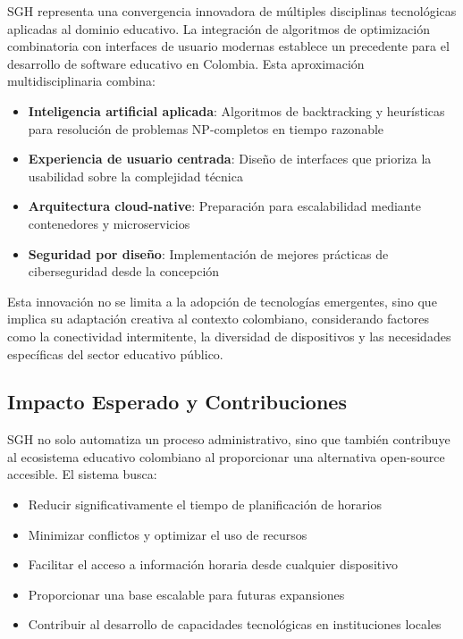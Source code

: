 SGH representa una convergencia innovadora de múltiples disciplinas tecnológicas aplicadas al dominio educativo. La integración de algoritmos de optimización combinatoria con interfaces de usuario modernas establece un precedente para el desarrollo de software educativo en Colombia. Esta aproximación multidisciplinaria combina:

\begin{itemize}
\item \textbf{Inteligencia artificial aplicada}: Algoritmos de backtracking y heurísticas para resolución de problemas NP-completos en tiempo razonable
\item \textbf{Experiencia de usuario centrada}: Diseño de interfaces que prioriza la usabilidad sobre la complejidad técnica
\item \textbf{Arquitectura cloud-native}: Preparación para escalabilidad mediante contenedores y microservicios
\item \textbf{Seguridad por diseño}: Implementación de mejores prácticas de ciberseguridad desde la concepción
\end{itemize}

Esta innovación no se limita a la adopción de tecnologías emergentes, sino que implica su adaptación creativa al contexto colombiano, considerando factores como la conectividad intermitente, la diversidad de dispositivos y las necesidades específicas del sector educativo público.

\subsection{Impacto Esperado y Contribuciones}

SGH no solo automatiza un proceso administrativo, sino que también contribuye al ecosistema educativo colombiano al proporcionar una alternativa open-source accesible. El sistema busca:

\begin{itemize}
\item Reducir significativamente el tiempo de planificación de horarios
\item Minimizar conflictos y optimizar el uso de recursos
\item Facilitar el acceso a información horaria desde cualquier dispositivo
\item Proporcionar una base escalable para futuras expansiones
\item Contribuir al desarrollo de capacidades tecnológicas en instituciones locales
\end{itemize}


